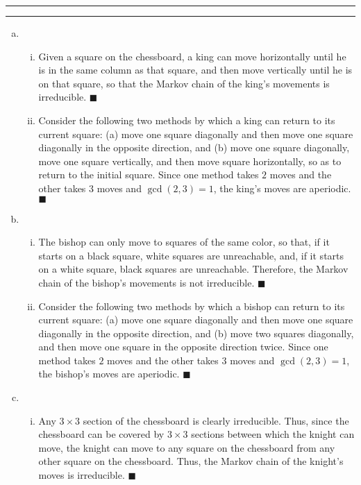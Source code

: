 \documentclass[11pt]{article}
\newcounter{questionCounter}
\newcounter{partCounter}[questionCounter]
\newenvironment{question}[2][\arabic{questionCounter}]{%
    \setcounter{partCounter}{0}%
    \vspace{.25in} \hrule \vspace{0.5em}%
        \noindent{\bf #2}%
    \vspace{0.8em} \hrule \vspace{.10in}%
    \addtocounter{questionCounter}{1}%
}{}
\renewcommand{\qed}{\quad $\blacksquare$}
\begin{document}
\begin{question}{Problem 9.8 Randomized Chess}
\begin{enumerate}[(a)]
\item
\begin{enumerate}[(i)]
\item Given a square on the chessboard, a king can move horizontally until he
is in the same column as that square, and then move vertically until he is on
that square, so that the Markov chain of the king's movements is irreducible.
\qed

\item Consider the following two methods by which a king can return to its
current square: (a) move one square diagonally and then move one square
diagonally in the opposite direction, and (b) move one square diagonally, move
one square vertically, and then move square horizontally, so as to return to
the initial square. Since one method takes $2$ moves and the other takes $3$
moves and $\gcd(2,3) = 1$, the king's moves are aperiodic. \qed
\end{enumerate}

\item
\begin{enumerate}[(i)]
\item The bishop can only move to squares of the same color, so that, if it
starts on a black square, white squares are unreachable, and, if it starts on
a white square, black squares are unreachable. Therefore, the Markov chain of
the bishop's movements is not irreducible. \qed

\item Consider the following two methods by which a bishop can return to its
current square: (a) move one square diagonally and then move one square
diagonally in the opposite direction, and (b) move two squares diagonally, and
then move one square in the opposite direction twice. Since one method takes
$2$ moves and the other takes $3$ moves and $\gcd(2,3) = 1$, the bishop's
moves are aperiodic. \qed
\end{enumerate}

\item
\begin{enumerate}[(i)]
\item Any $3 \times 3$ section of the chessboard is clearly irreducible. Thus,
since the chessboard can be covered by $3 \times 3$ sections between which the
knight can move, the knight can move to any square on the chessboard from any
other square on the chessboard. Thus, the Markov chain of the knight's moves
is irreducible. \qed


\end{enumerate}
\end{enumerate}
\end{question}
\end{document}
